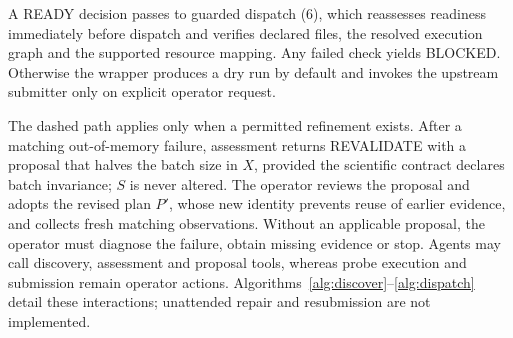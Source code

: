 A READY decision passes to guarded dispatch (6), which reassesses readiness immediately before dispatch and verifies declared files, the resolved execution graph and the supported resource mapping. Any failed check yields BLOCKED. Otherwise the wrapper produces a dry run by default and invokes the upstream submitter only on explicit operator request.

The dashed path applies only when a permitted refinement exists. After a matching out-of-memory failure, assessment returns REVALIDATE with a proposal that halves the batch size in $X$, provided the scientific contract declares batch invariance; $S$ is never altered. The operator reviews the proposal and adopts the revised plan $P'$, whose new identity prevents reuse of earlier evidence, and collects fresh matching observations. Without an applicable proposal, the operator must diagnose the failure, obtain missing evidence or stop. Agents may call discovery, assessment and proposal tools, whereas probe execution and submission remain operator actions. Algorithms~\ref{alg:discover}--\ref{alg:dispatch} detail these interactions; unattended repair and resubmission are not implemented.

